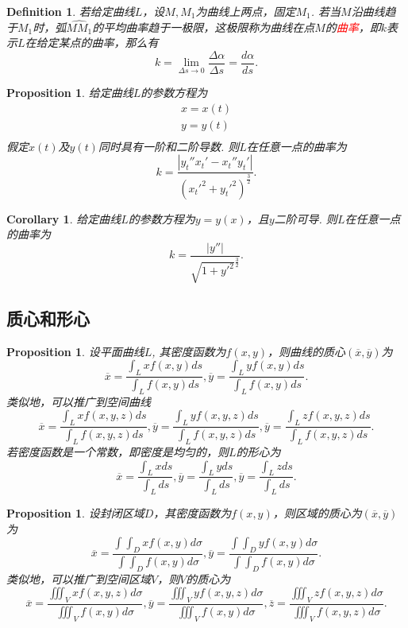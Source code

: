 \documentclass{article}
\newtheorem{corollary}[theorem]{Corollary}
\newtheorem{proposition}[theorem]{Proposition}
\newtheorem{definition}[theorem]{Definition}
\newcommand{\redt}[1]{\textcolor{red}{#1}}
\begin{document}
\begin{definition}
\rm 若给定曲线$L$，设$M,M_1$为曲线上两点，固定$M_1$. 若当$M$沿曲线趋于$M_1$时，弧$\widehat{MM_1}$的平均曲率趋于一极限，这极限称为曲线在点$M$的\redt{曲率}，即$k$表示$L$在给定某点的曲率，那么有
$$
k =  \lim\limits_{\Delta s \to 0} \frac{\Delta \alpha}{\Delta s} = \frac{d\alpha}{ds}.
$$ 
\end{definition}

\begin{proposition}
\rm 给定曲线$L$的参数方程为
$$
\begin{array}{ll}
x = x(t) \\
y = y(t) \\
\end{array}
$$
假定$x(t)$及$y(t)$同时具有一阶和二阶导数. 则$L$在任意一点的曲率为
$$
k = \frac{|y_t''x_t'-x_t''y_t'|}{(x_t'^2 + y_t'^2)^{\frac{3}{2}}}.
$$
\end{proposition}

\begin{corollary}
\rm 给定曲线$L$的参数方程为$y=y(x)$，且$y$二阶可导. 则$L$在任意一点的曲率为
$$
k = \frac{|y''|}{\sqrt{1+y'^2}^{\frac{3}{2}}}.
$$
\end{corollary}


\subsection{质心和形心}

\begin{proposition}
\rm 设平面曲线$L$, 其密度函数为$f(x,y)$，则曲线的质心$(\overline{x},\overline{y})$为
$$
\overline{x} = \frac{\int_L xf(x,y)ds}{\int_L f(x,y)ds}, \overline{y} = \frac{\int_L yf(x,y)ds}{\int_L f(x,y)ds}.
$$
类似地，可以推广到空间曲线
$$
\overline{x} = \frac{\int_L xf(x,y,z)ds}{\int_L f(x,y,z)ds}, \overline{y} = \frac{\int_L yf(x,y,z)ds}{\int_L f(x,y,z)ds},
\overline{y} = \frac{\int_L zf(x,y,z)ds}{\int_L f(x,y,z)ds}.
$$
若密度函数是一个常数，即密度是均匀的，则$L$的形心为
$$
\overline{x} = \frac{\int_L xds}{\int_L ds}, \overline{y} = \frac{\int_L yds}{\int_L ds},
\overline{y} = \frac{\int_L zds}{\int_L ds}.
$$
\end{proposition}

\begin{proposition}
\rm 设封闭区域$D$，其密度函数为$f(x,y)$，则区域的质心为$(\overline{x},\overline{y})$为
$$
\overline{x} = \frac{\int\int_D xf(x,y)d\sigma}{\int\int_D f(x,y)d\sigma}, \overline{y} = \frac{\int\int_D yf(x,y)d\sigma}{\int\int_D f(x,y)d\sigma}.
$$
类似地，可以推广到空间区域$V$，则$V$的质心为
$$
\overline{x} = \frac{\iiint_V xf(x,y,z)d\sigma}{\iiint_V f(x,y)d\sigma}, 
\overline{y} = \frac{\iiint_V yf(x,y,z)d\sigma}{\iiint_V f(x,y)d\sigma},
\overline{z} = \frac{\iiint_V zf(x,y,z)d\sigma}{\iiint_V f(x,y,z)d\sigma}.
$$
\end{proposition}
\end{document}
